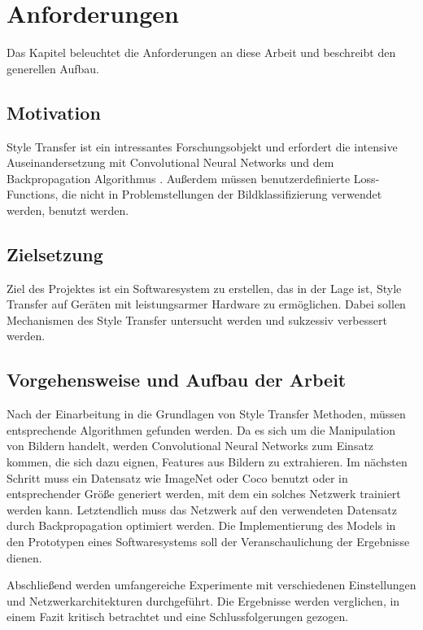 \chapter{Anforderungen}

Das Kapitel beleuchtet die Anforderungen an diese Arbeit und beschreibt den generellen Aufbau.

\section{Motivation}

Style Transfer ist ein intressantes Forschungsobjekt und erfordert die intensive Auseinandersetzung mit Convolutional Neural Networks \cite{lecun-gradientbased-learning-applied-1998} und dem Backpropagation Algorithmus \cite{doi:10.1162/neco.1989.1.4.541}. Außerdem müssen benutzerdefinierte Loss-Functions, die nicht in Problemstellungen der Bildklassifizierung verwendet werden, benutzt werden.

\section{Zielsetzung}

Ziel des Projektes ist ein Softwaresystem zu erstellen, das in der Lage ist, Style Transfer auf Geräten mit leistungsarmer Hardware zu ermöglichen. Dabei sollen Mechanismen des Style Transfer untersucht werden und sukzessiv verbessert werden.

\section{Vorgehensweise und Aufbau der Arbeit}

Nach der Einarbeitung in die Grundlagen von Style Transfer \cite{DBLP:journals/corr/GatysEB15a, DBLP:journals/corr/JohnsonAL16} Methoden, müssen entsprechende Algorithmen gefunden werden. Da es sich um die Manipulation von Bildern handelt, werden Convolutional Neural Networks \cite{lecun-gradientbased-learning-applied-1998} zum Einsatz kommen, die sich dazu eignen, Features aus Bildern zu extrahieren. Im nächsten Schritt muss ein Datensatz wie ImageNet \cite{imagenet_cvpr09} oder Coco \cite{DBLP:journals/corr/LinMBHPRDZ14} benutzt oder in entsprechender Größe generiert werden, mit dem ein solches Netzwerk trainiert werden kann. Letztendlich muss das Netzwerk auf den verwendeten Datensatz durch Backpropagation \cite{doi:10.1162/neco.1989.1.4.541} optimiert werden. Die Implementierung des Models in den Prototypen eines Softwaresystems soll der Veranschaulichung der Ergebnisse dienen.

Abschließend werden umfangereiche Experimente mit verschiedenen Einstellungen und Netzwerkarchitekturen durchgeführt.
Die Ergebnisse werden verglichen, in einem Fazit kritisch betrachtet und eine Schlussfolgerungen gezogen.